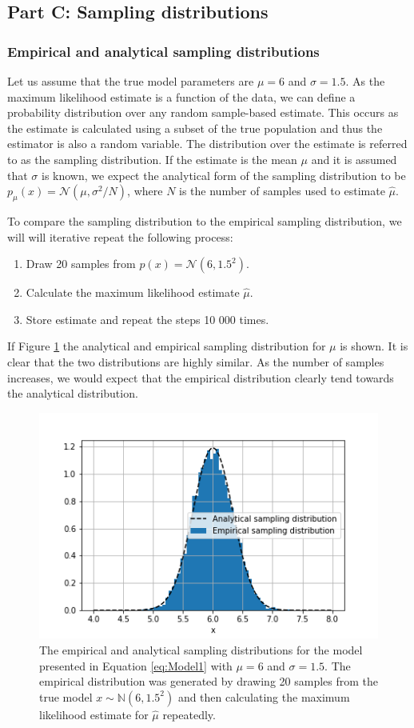 \documentclass{article}
\begin{document}
 \subsection{Part C: Sampling distributions}
 
 \subsubsection{Empirical and analytical sampling distributions}
 Let us assume that the true model parameters are $\mu=6$ and $\sigma = 1.5$. As the maximum likelihood estimate is a function of the data,  we can define a probability distribution over any random sample-based estimate. This occurs as the estimate is calculated using a subset of the true population and thus the estimator is also a random variable. The distribution over the estimate is referred to as the sampling distribution. If the estimate is the mean $\mu$ and it is assumed that $\sigma$ is known, we expect the analytical form of the sampling distribution to be $p_{\mu}(x) = \mathcal{N}(\mu, \sigma^2/N)$, where $N$ is the number of samples used to estimate $\hat{\mu}$.

To compare the sampling distribution to the empirical sampling distribution, we will will iterative repeat the following process:
\begin{enumerate}
    \item Draw 20 samples from $p(x) = \mathcal{N}(6, 1.5^2)$.
    \item Calculate the maximum likelihood estimate $\hat{\mu}$.
    \item Store estimate and repeat the steps 10 000 times.
\end{enumerate}
 
 If Figure \ref{fig:Q1c_1} the analytical and empirical sampling distribution for $\mu$ is shown. It is clear that the two distributions are highly similar. As the number of samples increases, we would expect that the empirical distribution clearly tend towards the analytical distribution.
 \begin{figure}[!htb]
     \centering
     \includegraphics[scale=0.6]{Q1c_fig1.png}
     \caption{The empirical and analytical sampling distributions for the model presented in Equation \eqref{eq:Model1} with $\mu=6$ and $\sigma=1.5$. The empirical distribution was generated by drawing 20 samples from the true model $x\sim \mathbb{N}(6, 1.5^2)$ and then calculating the maximum likelihood estimate for $\hat{\mu}$ repeatedly.}
     \label{fig:Q1c_1}
 \end{figure}
 
\end{document}
